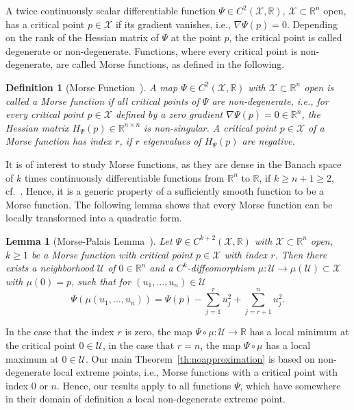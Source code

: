 \documentclass[10pt]{article}
\numberwithin{equation}{section}
\newtheorem{definition}[theorem]{Definition}
\newtheorem{lemma}[theorem]{Lemma}
\begin{document}
	A twice continuously scalar differentiable function $\Psi \in C^2(\mathcal{X},\mathbb{R})$, $\mathcal{X}\subset \mathbb{R}^n$ open, has a critical point $p \in \mathcal{X}$ if its gradient vanishes, i.e., $\nabla \Psi(p) = 0$. Depending on the rank of the Hessian matrix of $\Psi$ at the point $p$, the critical point is called degenerate or non-degenerate. Functions, where every critical point is non-degenerate, are called Morse functions, as defined in the following.  
	
	\begin{definition}[Morse Function~\cite{Hirsch1976, Morse1934}] \label{def:morse}
		A map $\Psi \in C^2(\mathcal{X}, \mathbb{R})$ with $\mathcal{X} \subset \mathbb{R}^n$ open is called a Morse function if all critical points of $\Psi$ are non-degenerate, i.e., for every critical point $p \in \mathcal{X}$ defined by a zero gradient $\nabla \Psi(p) = 0 \in \mathbb{R}^n$, the Hessian matrix $H_{\Psi}(p)\in \mathbb{R}^{n \times n}$ is non-singular. A critical point $p \in \mathcal{X}$ of a Morse function has index $r$, if $r$ eigenvalues of $H_{\Psi}(p)$ are negative.
	\end{definition}
	
	It is of interest to study Morse functions, as they are dense in the Banach space of $k$ times continuously differentiable functions from $\mathbb{R}^n$ to $\mathbb{R}$, if $k \geq n+1 \geq 2$, cf.\ \cite{Kuehn2024}. Hence, it is a generic property of a sufficiently smooth function to be a Morse function. The following lemma shows that every Morse function can be locally transformed into a quadratic form. 
	
	\begin{lemma}[Morse-Palais Lemma~\cite{Hirsch1976,Palais1969}] \label{lem:morse}
		Let $\Psi \in C^{k+2}(\mathcal{X},\mathbb{R})$ with $\mathcal{X} \subset \mathbb{R}^n$ open, $k \geq 1$ be a Morse function with critical point $p \in \mathcal{X}$  with index $r$. Then there exists a neighborhood $\mathcal{U}$ of $0 \in \mathbb{R}^n$ and a $C^k$-diffeomorphism $\mu: \mathcal{U} \rightarrow \mu(\mathcal{U}) \subset \mathcal{X}$ with $\mu(0) = p$, such that for $(u_1,\ldots,u_n) \in \mathcal{U}$
		\begin{equation}\label{eq:morse_palais}
			\Psi(\mu(u_1,\ldots,u_n)) = \Psi(p) - \sum_{j = 1}^r u_j^2 + \sum_{j = r+1}^n u_j^2.
		\end{equation}
	\end{lemma}
	
	In the case that the index $r$ is zero, the map $\Psi\circ\mu:\mathcal{U}\rightarrow \mathbb{R}$ has a local minimum at the critical point $0\in\mathcal{U}$, in the case that $r = n$, the map $\Psi \circ \mu$ has a local maximum at $0\in\mathcal{U}$. Our main Theorem~\ref{th:noapproximation} is based on non-degenerate local extreme points, i.e., Morse functions with a critical point with index $0$ or $n$. Hence, our results apply to all functions $\Psi$, which have somewhere in their domain of definition a local non-degenerate extreme point.
	
\end{document}
